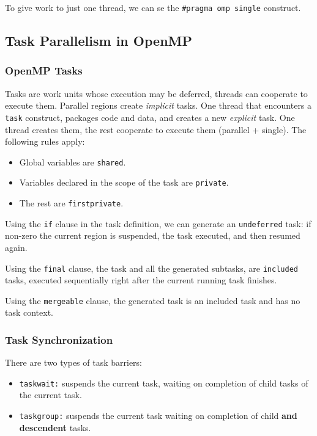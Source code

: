 To give work to just one thread, we can se the \texttt{\#pragma omp single} construct.

\subsection{Task Parallelism in OpenMP}

\subsubsection{OpenMP Tasks}
Tasks are work units whose execution may be deferred, threads can cooperate to execute them.
Parallel regions create \textit{implicit} tasks.
One thread that encounters a \texttt{task} construct, packages code and data, and creates a new \textit{explicit} task.
One thread creates them, the rest cooperate to execute them (parallel + single).
The following rules apply:
\begin{itemize}
    \item Global variables are \texttt{shared}.
    \item Variables declared in the scope of the task are \texttt{private}.
    \item The rest are \texttt{firstprivate}.
\end{itemize}

Using the \texttt{if} clause in the task definition, we can generate an \texttt{undeferred} task: if non-zero the current region is suspended, the task executed, and then resumed again.

Using the \texttt{final} clause, the task and all the generated subtasks, are \texttt{included} tasks, executed sequentially right after the current running task finishes.

Using the \texttt{mergeable} clause, the generated task is an included task and has no task context.

\subsubsection{Task Synchronization}

There are two types of task barriers:
\begin{itemize}
    \item \texttt{taskwait:} suspends the current task, waiting on completion of child tasks of the current task.
    \item \texttt{taskgroup:} suspends the current task waiting on completion of child \textbf{and descendent} tasks.
\end{itemize}
